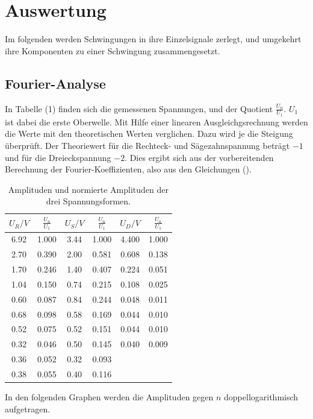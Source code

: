 \section{Auswertung}
\label{sec:Auswertung}

Im folgenden werden Schwingungen in ihre Einzelsignale zerlegt, und umgekehrt ihre Komponenten zu einer Schwingung zusammengesetzt.

\subsection{Fourier-Analyse}
In Tabelle (1) finden sich die gemessenen Spannungen, und der Quotient $\frac{U_n}{U_1}$. $U_1$ ist dabei die erste Oberwelle. Mit Hilfe einer linearen Ausgleichgsrechnung werden die Werte mit den theoretischen
Werten verglichen. Dazu wird je die Steigung überprüft. Der Theoriewert für die Rechteck- und Sägezahnspannung beträgt $-1$ und für
die Dreieckspannung $-2$. Dies ergibt sich aus der vorbereitenden Berechnung der Fourier-Koeffizienten, also aus den Gleichungen ().


\begin{table}[H]
  \centering
  \caption{Amplituden und normierte Amplituden der drei Spannungsformen.}
  \label{tab:Rechteckspannung}
  \begin{tabular}{c c | c c | c c}
    \toprule
    $U_R/V$ & $\frac{U_n}{U_1}$ & $U_S/V$ & $\frac{U_n}{U_1}$ & $U_D/V$ & $\frac{U_n}{U_1}$ \\
    \midrule
    6.92 & 1.000 & 3.44 & 1.000 & 4.400 &  1.000\\
    2.70 & 0.390 & 2.00 & 0.581 & 0.608 &  0.138\\
    1.70 & 0.246 & 1.40 & 0.407 & 0.224 &  0.051\\
    1.04 & 0.150 & 0.74 & 0.215 & 0.108 &  0.025\\
    0.60 & 0.087 & 0.84 & 0.244 & 0.048 &  0.011\\
    0.68 & 0.098 & 0.58 & 0.169 & 0.044 &  0.010\\
    0.52 & 0.075& 0.52 & 0.151 & 0.044 &  0.010\\
    0.32 & 0.046 & 0.50 & 0.145 & 0.040 &  0.009\\
    0.36 & 0.052& 0.32 & 0.093 \\
    0.38 & 0.055& 0.40 & 0.116 \\
    \bottomrule
  \end{tabular}
\end{table}

\noindent In den folgenden Graphen werden die Amplituden gegen $n$ doppellogarithmisch aufgetragen.

